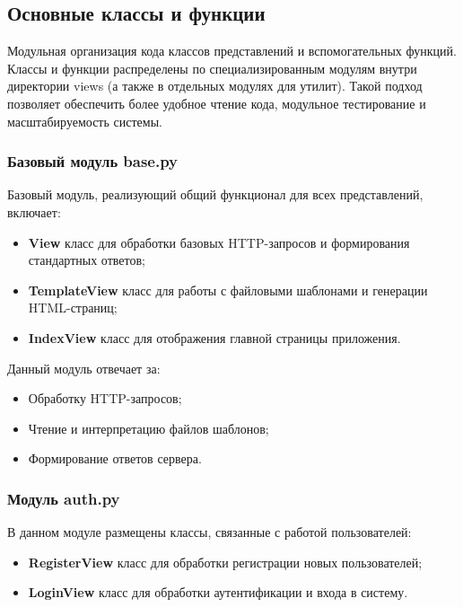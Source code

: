 \subsection{Основные классы и функции}

Модульная организация кода классов представлений и вспомогательных функций. Классы и функции распределены по специализированным модулям внутри директории views (а также в отдельных модулях для утилит). Такой подход позволяет обеспечить более удобное чтение кода, модульное тестирование и масштабируемость системы.

\subsubsection{Базовый модуль base.py} 
Базовый модуль, реализующий общий функционал для всех представлений, включает:
\begin{itemize}
	\item \textbf{View} класс для обработки базовых HTTP-запросов и формирования стандартных ответов;
	\item \textbf{TemplateView} класс для работы с файловыми шаблонами и генерации HTML-страниц;
	\item \textbf{IndexView} класс для отображения главной страницы приложения.
\end{itemize}
Данный модуль отвечает за:
\begin{itemize}
	\item Обработку HTTP-запросов;
	\item Чтение и интерпретацию файлов шаблонов;
	\item Формирование ответов сервера.
\end{itemize}

\subsubsection{Модуль auth.py}
В данном модуле размещены классы, связанные с работой пользователей:
\begin{itemize}
	\item \textbf{RegisterView} класс для обработки регистрации новых пользователей;
	\item \textbf{LoginView} класс для обработки аутентификации и входа в систему.
\end{itemize}

